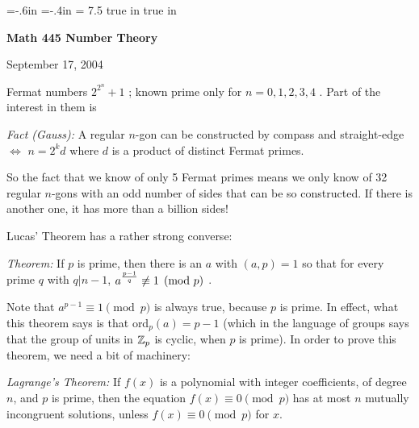 





\loadmsbm

\nopagenumbers
\parindent=0pt

\voffset=-.6in
\hoffset=-.4in
\hsize = 7.5 true in
 true in


\overfullrule=0pt


\def\ctln{\centerline}
\def\u{\underbar}
\def\ssk{\smallskip}
\def\msk{\medskip}
\def\bsk{\bigskip}


\ctln{\bf Math 445 Number Theory}

\medskip

\ctln{September 17, 2004}

\bigskip

Fermat numbers $\displaystyle 2^{2^n}+1$ ; known prime only for $n=0,1,2,3,4$ . Part of the interest in them is

\ssk

{\it Fact (Gauss):} A regular $n$-gon can be constructed by compass and straight-edge $\Leftrightarrow$ $n= 2^kd$ where
$d$ is a product of distinct Fermat primes. 

\ssk

So the fact that we know of only 5 Fermat primes means we only know of 32 regular $n$-gons with an odd number of sides that
can be so constructed. If there is another one, it has more than a billion sides!

\bsk

Lucas' Theorem has a rather strong converse:

\ssk

{\it Theorem:} If $p$ is prime, then there is an $a$ with $(a,p)=1$ so that for every prime $q$ 
with $q|n-1$, $\displaystyle a^{{p-1}\over{q}}\not\equiv 1\pmod{p}$ .

\ssk

Note that $a^{p-1}\equiv 1\pmod{p}$ is always true, because $p$ is prime. In effect, what this theorem
says is that ord$_p(a) = p-1$ (which in the language of groups says that the group of units in ${\Bbb Z}_p$ is
cyclic, when $p$ is prime). In order to prove this theorem, 
we need a bit of machinery:

\msk

{\it Lagrange's Theorem:} If $f(x)$ is a polynomial with integer coefficients, of degree $n$, and $p$ is prime,
then the equation $f(x)\equiv 0 \pmod{p}$ has at most $n$ mutually incongruent solutions, unless $f(x)\equiv 0 \pmod{p}$
for  $x$.

